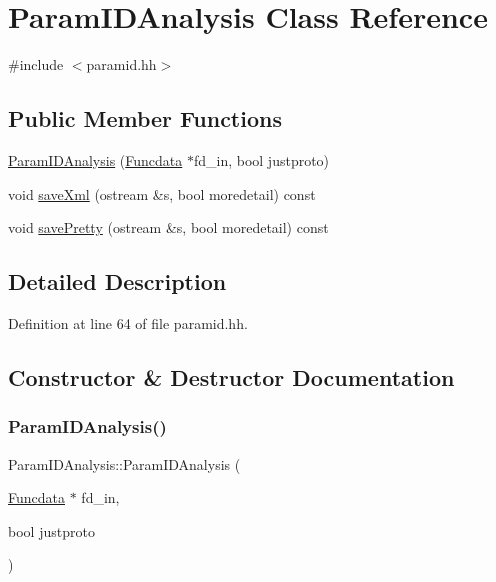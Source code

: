 \hypertarget{class_param_i_d_analysis}{}\section{Param\+I\+D\+Analysis Class Reference}
\label{class_param_i_d_analysis}


{\ttfamily \#include $<$paramid.\+hh$>$}

\subsection*{Public Member Functions}
\begin{DoxyCompactItemize}
\item 
\mbox{\hyperlink{class_param_i_d_analysis_a5a269356a5e9c10b70a50d38f9cf877a}{Param\+I\+D\+Analysis}} (\mbox{\hyperlink{class_funcdata}{Funcdata}} $\ast$fd\+\_\+in, bool justproto)
\item 
void \mbox{\hyperlink{class_param_i_d_analysis_a50452520f5707bb1440ad9a88ab278cc}{save\+Xml}} (ostream \&s, bool moredetail) const
\item 
void \mbox{\hyperlink{class_param_i_d_analysis_a188bdfa79597d13c285a1ff51976ce36}{save\+Pretty}} (ostream \&s, bool moredetail) const
\end{DoxyCompactItemize}


\subsection{Detailed Description}


Definition at line 64 of file paramid.\+hh.



\subsection{Constructor \& Destructor Documentation}
\mbox{\label{class_param_i_d_analysis_a5a269356a5e9c10b70a50d38f9cf877a}} 
\subsubsection{\texorpdfstring{ParamIDAnalysis()}{ParamIDAnalysis()}}
{\footnotesize\ttfamily Param\+I\+D\+Analysis\+::\+Param\+I\+D\+Analysis (\begin{DoxyParamCaption}\item[{\mbox{\hyperlink{class_funcdata}{Funcdata}} $\ast$}]{fd\+\_\+in,  }\item[{bool}]{justproto }\end{DoxyParamCaption})}



